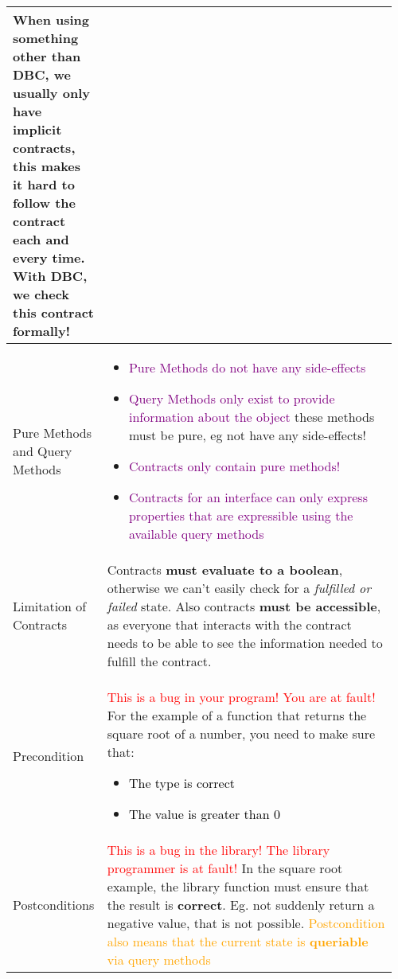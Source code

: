 \documentclass[main.tex,fontsize=8pt,paper=a4,paper=portrait,DIV=calc,]{scrartcl}
\begin{document}
\begin{table}[ht!]
\begin{tabular}{|m{0.2\linewidth}|m{0.755\linewidth}|}
When using something other than DBC, we \textbf{usually only have implicit contracts}, this makes it hard to follow the contract each and every time.\newline
With DBC, we check this contract \textbf{formally!}\\
\hline
Pure Methods and Query Methods & 
\vspace{2mm}
\begin{itemize}
\item \textcolor{purple}{Pure Methods do not have any side-effects}
\item \textcolor{purple}{Query Methods only exist to provide information about the object}\newline
  these methods must be pure, eg not have any side-effects!
\item \textcolor{purple}{Contracts only contain pure methods!}
\item \textcolor{purple}{Contracts for an interface can only express properties that are expressible using the available query methods}
\vspace{-3mm}
\end{itemize}\\ 
\hline
Limitation of Contracts & 
Contracts \textbf{must evaluate to a boolean}, otherwise we can't easily check for a \emph{fulfilled or failed} state.\newline
Also contracts \textbf{must be accessible}, as everyone that interacts with the contract needs to be able to see the information needed to fulfill the contract.\\
\hline
Precondition & 
\textcolor{red}{This is a bug in your program! You are at fault!}\newline
For the example of a function that returns the square root of a number, you need to make sure that: \newline
\begin{itemize}
\item \textcolor{black}{The type is correct}
\item \textcolor{black}{The value is greater than 0}
\vspace{-3mm}
\end{itemize} 
\\
\hline
Postconditions & 
\textcolor{red}{This is a bug in the library! The library programmer is at fault!}\newline
In the square root example, the library function must ensure that the result is \textbf{correct}.\newline
Eg. not suddenly return a negative value, that is not possible.\newline
\textcolor{orange}{Postcondition also means that the current state is \textbf{queriable} via query methods}\\
\hline
\end{tabular}
\end{table}
\end{document}
